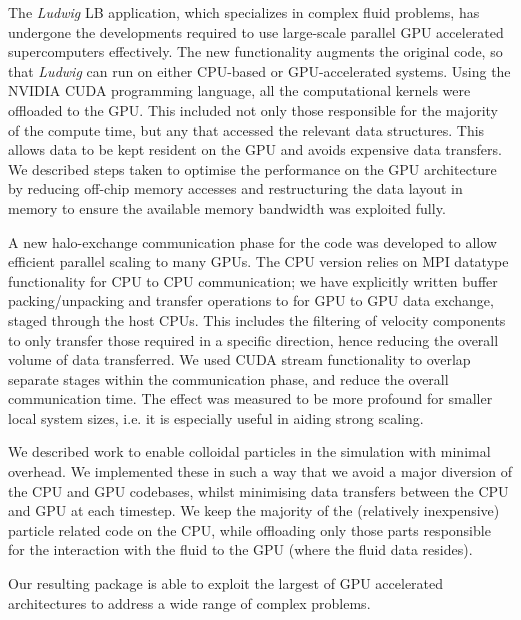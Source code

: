 The \textit{Ludwig} LB application, which specializes
in complex fluid problems, has undergone the developments required to
use large-scale parallel GPU accelerated supercomputers effectively.
The new functionality augments the original code, so that
\textit{Ludwig} can run on either CPU-based or GPU-accelerated systems. 
Using the NVIDIA CUDA programming language, all the computational
kernels were offloaded to the GPU. This included not only those
responsible for the majority of the compute time, but any that
accessed the relevant data structures. This allows data to be kept
resident on the GPU and avoids expensive data transfers. We described
steps taken to optimise the performance on the GPU architecture by
reducing off-chip memory accesses and restructuring the data layout
in memory to ensure the available memory bandwidth was exploited fully.

A new halo-exchange communication phase for the code was developed to
allow efficient parallel scaling to many GPUs. The CPU version
relies on MPI datatype functionality for CPU to CPU communication; we
have explicitly written buffer packing/unpacking and transfer
operations to for GPU to GPU data exchange, staged through the host
CPUs. This includes the filtering of velocity components to only
transfer those required in a specific direction, hence reducing the
overall volume of data transferred. We used CUDA stream functionality
to overlap separate stages within the communication phase, and reduce
the overall communication time. The effect was measured to be more
profound for smaller local system sizes, i.e. it is especially useful
in aiding strong scaling.

We described work to enable colloidal particles in the simulation with
minimal overhead. We implemented these in such a way that we avoid a
major diversion of the CPU and GPU codebases, whilst minimising data
transfers between the CPU and GPU at each timestep. We keep the
majority of the (relatively inexpensive) particle related code on the
CPU, while offloading only those parts responsible for the interaction
with the fluid to the GPU (where the fluid data resides).

Our resulting package is able to exploit the largest of GPU
accelerated architectures to address a wide range of complex problems.




